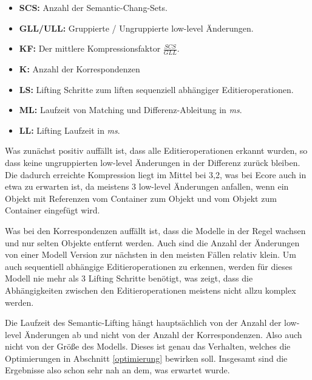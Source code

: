  \begin{itemize}
   \item \textbf{SCS:} Anzahl der Semantic-Chang-Sets.
   \item \textbf{GLL/ULL:} Gruppierte / Ungruppierte low-level Änderungen.
   \item \textbf{KF:} Der mittlere Kompressionsfaktor  $\frac{SCS}{GLL}$.
   \item \textbf{K:} Anzahl der Korrespondenzen
   \item \textbf{LS:} Lifting Schritte zum 
   liften sequenziell abhängiger Editieroperationen.
   \item \textbf{ML:} Laufzeit von Matching und Differenz-Ableitung in \textit{ms}.
   \item \textbf{LL:} Lifting Laufzeit in \textit{ms}.
 \end{itemize}
 Was zunächst positiv auffällt ist, dass alle Editieroperationen erkannt wurden, so dass keine
 ungruppierten low-level Änderungen in der Differenz zurück bleiben. Die dadurch erreichte
 Kompression liegt im Mittel bei 3,2, was bei Ecore auch in etwa zu erwarten ist, da meistens 3
 low-level Änderungen anfallen, wenn ein Objekt mit Referenzen vom Container zum Objekt und vom
 Objekt zum Container eingefügt wird. 
 
 Was bei den Korrespondenzen auffällt ist, dass die Modelle in der Regel wachsen und nur selten
 Objekte entfernt werden. Auch sind die Anzahl der Änderungen von einer Modell Version zur
 nächsten in den meisten Fällen relativ klein. Um auch sequentiell abhängige Editieroperationen zu
 erkennen, werden für dieses Modell nie mehr als 3 Lifting Schritte benötigt, was zeigt, dass die
 Abhängigkeiten zwischen den Editieroperationen meistens nicht allzu komplex werden.
 
Die Laufzeit des Semantic-Lifting hängt hauptsächlich von der Anzahl der low-level Änderungen
 ab und nicht von der Anzahl der Korrespondenzen. Also auch nicht von der Größe des Modells. Dieses
 ist genau das Verhalten, welches die Optimierungen in Abschnitt \ref{optimierung} bewirken soll.
 Insgesamt sind die Ergebnisse also schon sehr nah an dem, was erwartet wurde.
